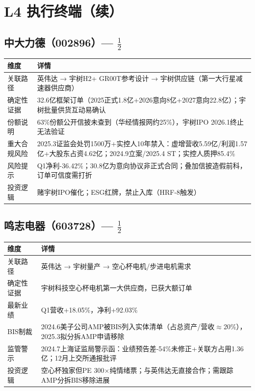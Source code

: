 \section{L4 执行终端（续）}

\subsection{中大力德（002896）--- \starthree{}$\frac{1}{2}$}

\begin{table}[H]
\centering\small
\renewcommand{\arraystretch}{1.3}
\begin{tabularx}{\textwidth}{l X}
\toprule
\textbf{维度} & \textbf{详情} \\
\midrule
关联路径 & 英伟达 → 宇树H2+ GR00T参考设计 → 宇树供应链（第一大行星减速器供应商） \\
确定性证据 & 32.6亿框架订单（2025正式1.8亿+2026意向8亿+2027意向22.8亿）；宇树批量供货互动易确认 \\
份额说明 & \textcolor{riskamber}{63\%份额公开信披未查到（华经情报网约25\%），宇树IPO 2026.1终止无法验证} \\
\textcolor{riskred}{重大合规风险} & \textcolor{riskred}{2025.3证监会处罚1500万+实控人10年禁入：虚增营收5.59亿/利润1.57亿+大股东占资4.62亿；2024.9立案/2025.4 ST；实控人质押85.4\%} \\
风险提示 & Q1净利-36.42\%；30.8亿为意向协议非正式合同；叠加信披造假前科，订单可信度需打折 \\
投资逻辑 & 赌宇树IPO催化；\textcolor{riskred}{ESG红牌，禁止入库（HRF-8触发）} \\
\bottomrule
\end{tabularx}
\end{table}

\subsection{鸣志电器（603728）--- \starthree{}$\frac{1}{2}$}

\begin{table}[H]
\centering\small
\renewcommand{\arraystretch}{1.3}
\begin{tabularx}{\textwidth}{l X}
\toprule
\textbf{维度} & \textbf{详情} \\
\midrule
关联路径 & 英伟达 → 宇树量产 → 空心杯电机/步进电机需求 \\
确定性证据 & 宇树科技空心杯电机第一大供应商，已获大额订单 \\
最新业绩 & Q1营收+18.05\%，净利+92.03\% \\
\textcolor{riskred}{BIS制裁} & \textcolor{riskred}{2024.6美子公司AMP被BIS列入实体清单（占总资产/营收$\approx$20\%），2025.3拟分拆AMP申请移除} \\
\textcolor{riskred}{监管警示} & \textcolor{riskred}{2024.7上海证监局警示函：业绩预告差-54\%未修正+关联方占用1.36亿；12月上交所通报批评} \\
投资逻辑 & 空心杯独家但PE 300$\times$纯情绪票；与英伟达无直接合作；需跟踪AMP分拆BIS移除进展 \\
\bottomrule
\end{tabularx}
\end{table}

